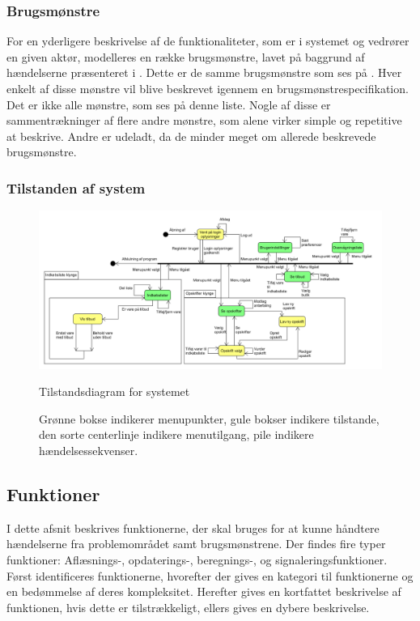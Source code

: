 \subsubsection{Brugsmønstre}
For en yderligere beskrivelse af de funktionaliteter, som er i systemet og vedrører en given aktør, modelleres en række brugsmønstre, lavet på baggrund af hændelserne præsenteret i .
Dette er de samme brugsmønstre som ses på .
Hver enkelt af disse mønstre vil blive beskrevet igennem en brugsmønstrespecifikation.
Det er ikke alle mønstre, som ses på denne liste.
Nogle af disse er sammentrækninger af flere andre mønstre, som alene virker simple og repetitive at beskrive.
Andre er udeladt, da de minder meget om allerede beskrevede brugsmønstre.



\subsubsection{Tilstanden af system}
\begin{figure}
	\centering
	\includegraphics[scale=0.6, angle=90]{images/Diagrams/Tilstandsdiagram.PNG}
	\caption{Tilstandsdiagram for systemet}
	\caption{Grønne bokse indikerer menupunkter, gule bokser indikere tilstande, den sorte centerlinje indikere menutilgang, pile indikere hændelsessekvenser.}\label{tilstandsdiagram}
\end{figure}



\subsection{Funktioner}\label{subsec:funktioner}

I dette afsnit beskrives funktionerne, der skal bruges for at kunne håndtere hændelserne fra problemområdet samt brugsmønstrene.
Der findes fire typer funktioner: Aflæsnings-, opdaterings-, beregnings-, og signaleringsfunktioner.\citep{OOA&D2001}
Først identificeres funktionerne, hvorefter der gives en kategori til funktionerne og en bedømmelse af deres kompleksitet. 
Herefter gives en kortfattet beskrivelse af funktionen, hvis dette er tilstrækkeligt, ellers gives en dybere beskrivelse.

